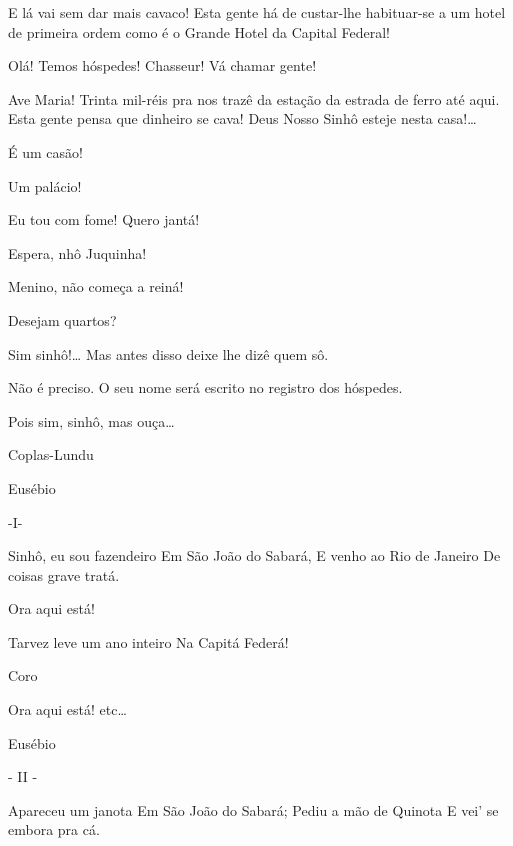   E lá vai sem dar mais cavaco! Esta gente há de custar-lhe
habituar-se a um hotel de primeira ordem como é o Grande Hotel da Capital
Federal!



 Olá! Temos hóspedes!  Chasseur! Vá chamar gente! 

  Ave
Maria! Trinta mil-réis pra nos trazê da estação da estrada de ferro até
aqui. Esta gente pensa que dinheiro se cava!  Deus Nosso
Sinhô esteje nesta casa!\ldots{} 

 É um casão!

 Um palácio!

 Eu tou com fome! Quero jantá!

 Espera, nhô Juquinha!

 Menino, não começa a reiná!

 Desejam quartos?

 Sim sinhô!\ldots{} Mas antes disso deixe lhe dizê quem sô.

 Não é preciso. O seu nome será escrito no registro dos
hóspedes.

 Pois sim, sinhô, mas ouça\ldots{}

 Coplas-Lundu

 Eusébio

 -I-

 Sinhô, eu sou fazendeiro
 Em São João do Sabará,
 E venho ao Rio de Janeiro
 De coisas grave tratá.

 Ora aqui está!

 Tarvez leve um ano inteiro
 Na Capitá Federá!

 Coro

 Ora aqui está! etc\ldots{}

 Eusébio

 - II -

 Apareceu um janota
 Em São João do Sabará;
 Pediu a mão de Quinota
 E vei’ se embora pra cá.

